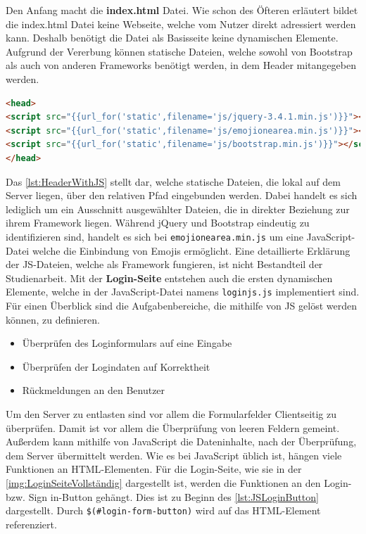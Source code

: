 \documentclass[a4paper,titlepage,halfparskip,12pt]{scrreprt}
\begin{document}
\begin{onehalfspacing}
Den Anfang macht die \textbf{index.html} Datei. Wie schon des Öfteren erläutert bildet die index.html Datei keine Webseite, welche vom Nutzer direkt adressiert werden kann. Deshalb benötigt die Datei als Basisseite keine dynamischen Elemente. Aufgrund der Vererbung können statische Dateien, welche sowohl von Bootstrap als auch von anderen Frameworks benötigt werden, in dem Header mitangegeben werden. 
\begin{lstlisting}[language=HTML,caption=Listing der eingebundenen JS-Dateien im Header der index.html,label={lst:HeaderWithJS}]
<head>
<script src="{{url_for('static',filename='js/jquery-3.4.1.min.js')}}"></script>
<script src="{{url_for('static',filename='js/emojionearea.min.js')}}"></script>
<script src="{{url_for('static',filename='js/bootstrap.min.js')}}"></script>
</head>
\end{lstlisting}
Das \autoref{lst:HeaderWithJS} stellt dar, welche statische Dateien, die lokal auf dem Server liegen, über den relativen Pfad eingebunden werden. Dabei handelt es sich lediglich um ein Ausschnitt ausgewählter Dateien, die in direkter Beziehung zur ihrem Framework liegen. Während jQuery und Bootstrap eindeutig zu identifizieren sind, handelt es sich bei \texttt{emojionearea.min.js} um eine JavaScript-Datei welche die Einbindung von Emojis ermöglicht. Eine detaillierte Erklärung der \ac{JS}-Dateien, welche als Framework fungieren, ist nicht Bestandteil der Studienarbeit. Mit der \textbf{Login-Seite} entstehen auch die ersten dynamischen Elemente, welche in der JavaScript-Datei namens \texttt{loginjs.js} implementiert sind. Für einen Überblick sind die Aufgabenbereiche, die mithilfe von \ac{JS} gelöst werden können, zu definieren.
\begin{itemize}
	\item Überprüfen des Loginformulars auf eine Eingabe
	\item Überprüfen der Logindaten auf Korrektheit
	\item Rückmeldungen an den Benutzer
\end{itemize}
Um den Server zu entlasten sind vor allem die Formularfelder Clientseitig zu überprüfen. Damit ist vor allem die Überprüfung von leeren Feldern gemeint. Außerdem kann mithilfe von JavaScript die Dateninhalte, nach der Überprüfung, dem Server übermittelt werden. Wie es bei JavaScript üblich ist, hängen viele Funktionen an \ac{HTML}-Elementen. Für die Login-Seite, wie sie in der \autoref{img:LoginSeiteVollständig} dargestellt ist, werden die Funktionen an den Login- bzw. Sign in-Button gehängt. Dies ist zu Beginn des \autoref{lst:JSLoginButton} dargestellt. Durch \texttt{\$(\#login-form-button)} wird auf das \ac{HTML}-Element referenziert. 

\end{onehalfspacing}
\end{document}
